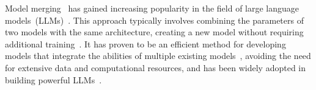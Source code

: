    
        
       



Model merging~\cite{task-arithmetic} has gained increasing popularity in the field of large language models~(LLMs)~\cite{task-arithmetic, ties, dare, metagpt}. This approach typically involves combining the parameters of two models with the same architecture, creating a new model without requiring additional training~\cite{task-arithmetic}. It has proven to be an efficient method for developing models that integrate the abilities of multiple existing models~\cite{ties, dare, metagpt}, avoiding the need for extensive data and computational resources, and has been widely adopted in building powerful LLMs~\cite{goddard2024mergekit,open-llm-leaderboard-v2}.



